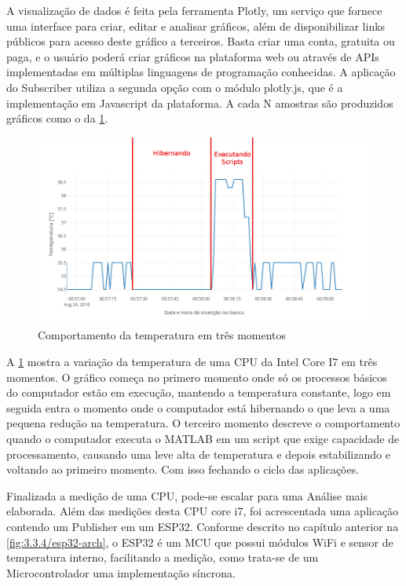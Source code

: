 A visualização de dados é feita pela ferramenta Plotly, um serviço que fornece uma interface para criar, editar e analisar gráficos, além de disponibilizar links públicos para acesso deste gráfico a terceiros. Basta criar uma conta, gratuita ou paga, e o usuário poderá criar gráficos na plataforma web ou através de APIs implementadas em múltiplas linguagens de programação conhecidas. A aplicação do Subscriber utiliza a segunda opção com o módulo plotly.js, que é a implementação em Javascript da plataforma. A cada N amostras são produzidos gráficos como o da  \ref{fig:4.1.0/cpu-temp_1}.


\begin{figure}[h!]
\centering
\includegraphics[width=16cm]{./02_Capitulos/02_Cap4/figures/cpu-temp_1}
\caption{Comportamento da temperatura em três momentos}
\label{fig:4.1.0/cpu-temp_1}
\end{figure}

A \ref{fig:4.1.0/cpu-temp_1} mostra a variação da temperatura de uma CPU da Intel Core I7 em três momentos. O gráfico começa no primero momento onde só os processos básicos do computador estão em execução, mantendo a temperatura constante, logo em seguida entra o momento onde o computador está hibernando o que leva a uma pequena redução na temperatura. O terceiro momento descreve o comportamento quando o computador executa o MATLAB em um script que exige capacidade de processamento, causando uma leve alta de temperatura e depois estabilizando e voltando ao primeiro momento. Com isso fechando o ciclo das aplicações.


Finalizada a medição de uma CPU, pode-se escalar para uma Análise mais elaborada. Além das medições desta CPU core i7, foi acrescentada uma aplicação contendo um Publisher em um ESP32. Conforme descrito no capítulo anterior na \ref{fig:3.3.4/esp32-arch}, o ESP32 é um MCU que possui módulos WiFi e sensor de temperatura interno, facilitando a medição, como trata-se de um Microcontrolador uma implementação síncrona.


